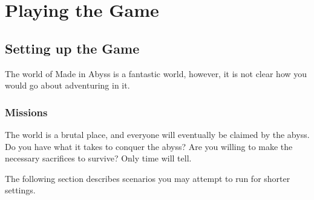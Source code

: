 \chapter{Playing the Game}


\section{Setting up the Game}

The world of Made in Abyss is a fantastic world, however, it is not clear how you would go about adventuring in it. 

\subsection{Missions}
The world is a brutal place, and everyone will eventually be claimed by the abyss. Do you have what it takes to conquer the abyss? Are you willing to make the necessary sacrifices to survive? Only time will tell.

The following section describes scenarios you may attempt to run for shorter settings.

